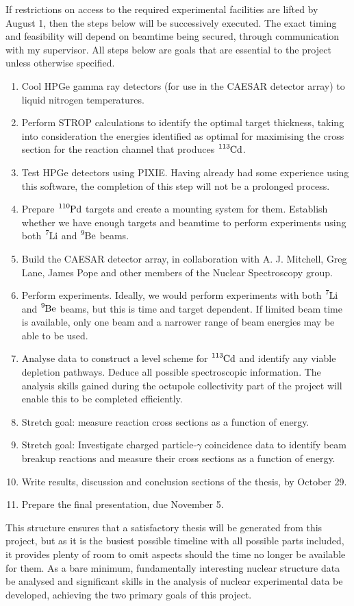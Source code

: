 \documentclass[12pt,a4paper]{article}
\begin{document}
\medskip
\noindent
If restrictions on access to the required experimental facilities are lifted by August 1, then the steps below will be successively executed. The exact timing and feasibility will depend on beamtime being secured, through communication with my supervisor. All steps below are goals that are essential to the project unless otherwise specified.
\begin{enumerate}
\item Cool HPGe gamma ray detectors (for use in the CAESAR detector array) to liquid nitrogen temperatures.
\item Perform STROP calculations to identify the optimal target thickness, taking into consideration the energies identified as optimal for maximising the cross section for the reaction channel that produces $\ce{^{113}Cd}$.
\item Test HPGe detectors using PIXIE. Having already had some experience using this software, the completion of this step will not be a prolonged process.
\item Prepare $\ce{^{110}Pd}$ targets and create a mounting system for them. Establish whether we have enough targets and beamtime to perform experiments using both $\ce{^{7}Li}$ and $\ce{^{9}Be}$ beams.
\item Build the CAESAR detector array, in collaboration with A. J. Mitchell, Greg Lane, James Pope and other members of the Nuclear Spectroscopy group.
\item Perform experiments. Ideally, we would perform experiments with both $\ce{^{7}Li}$ and $\ce{^{9}Be}$ beams, but this is time and target dependent. If limited beam time is available, only one beam and a narrower range of beam energies may be able to be used.
\item Analyse data to construct a level scheme for $\ce{^{113}Cd}$ and identify any viable depletion pathways.
Deduce all possible spectroscopic information.
The analysis skills gained during the octupole collectivity part of the project will enable this to be completed efficiently.
\item Stretch goal: measure reaction cross sections as a function of energy.
\item Stretch goal: Investigate charged particle-$\gamma$ coincidence data to identify beam breakup reactions and measure their cross sections as a function of energy.
\item Write results, discussion and conclusion sections of the thesis, by October 29.
\item Prepare the final presentation, due November 5.
\end{enumerate}
This structure ensures that a satisfactory thesis will be generated from this project, but as it is the busiest possible timeline with all possible parts included, it provides plenty of room to omit aspects should the time no longer be available for them.
As a bare minimum, fundamentally interesting nuclear structure data be analysed and significant skills in the analysis of nuclear experimental data be developed, achieving the two primary goals of this project.


{}
\end{document}
